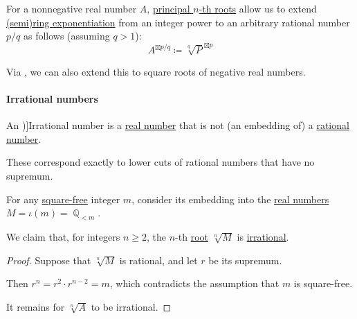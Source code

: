 \begin{definition}\label{def:real_number_rational_exponent}
  For a nonnegative real number \( A \), \hyperref[def:principal_nonnegative_nth_root]{principal \( n \)-th roots} allow us to extend \hyperref[def:semiring/exponentiation]{(semi)ring exponentiation} from an integer power to an arbitrary rational number \( p / q \) as follows (assuming \( q > 1 \)):
  \begin{equation}\label{eq:def:real_number_rational_exponent}
    A^{\boxtimes p / q} \coloneqq \sqrt[q]{ P }^{\boxtimes p}
  \end{equation}
\end{definition}
\begin{comments}
  \item Via , we can also extend this to square roots of negative real numbers.
\end{comments}

\paragraph{Irrational numbers}

\begin{definition}\label{def:irrational_number}
  An \term[ru=иррациональное число (\cite[def. II.1]{Александров1977ОбщаяТопология})]{Irrational number} is a \hyperref[def:real_numbers]{real number} that is not (an embedding of) a \hyperref[def:rational_numbers]{rational number}.
\end{definition}
\begin{comments}
  \item These correspond exactly to lower cuts of rational numbers that have no supremum.
\end{comments}

\begin{proposition}\label{thm:real_nth_root_is_irrational}
  For any \hyperref[def:square_free_element]{square-free} integer \( m \), consider its embedding into the \hyperref[def:real_numbers]{real numbers} \( M = \iota(m) = \BbbQ_{<m} \).

  We claim that, for integers \( n \geq 2 \), the \( n \)-th \hyperref[def:principal_nonnegative_nth_root]{root} \( \sqrt[n]{ M } \) is \hyperref[def:irrational_number]{irrational}.
\end{proposition}
\begin{proof}
  Suppose that \( \sqrt[n]{ M } \) is rational, and let \( r \) be its supremum.

  Then \( r^n = r^2 \cdot r^{n-2} = m \), which contradicts the assumption that \( m \) is square-free.

  It remains for \( \sqrt[n]{ A } \) to be irrational.
\end{proof}
